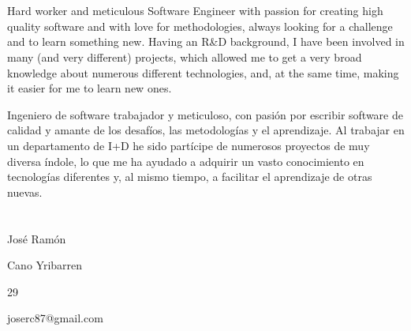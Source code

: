 \maketitle

\section{\ml{}{}} 

{\ml
{Hard worker and meticulous Software Engineer with passion for creating
high quality software and with love for methodologies, always looking for a
challenge and to learn something new. Having an R\&D background, I have been
involved in many (and very different) projects, which allowed me to get a very
broad knowledge about numerous different technologies, and, at the same time,
making it easier for me to learn new ones.}

{Ingeniero de software trabajador y meticuloso, con pasión por escribir
software de calidad y amante de los desafíos, las metodologías y el
aprendizaje. Al trabajar en un departamento de I+D he sido partícipe de
numerosos proyectos de muy diversa índole, lo que me ha ayudado a adquirir un
vasto conocimiento en tecnologías diferentes y, al mismo tiempo, a facilitar el
aprendizaje de otras nuevas.}}

\section{} 

\cvitem
    {}
    {José Ramón}

\cvitem
    {}
    {Cano Yribarren}

\cvitem
    {}
    {}

\cvitem
    {}
    {}

\cvitem
    {}
    {}

\cvitem
    {}
    {29}

\cvitem
    {}
    {joserc87@gmail.com}
